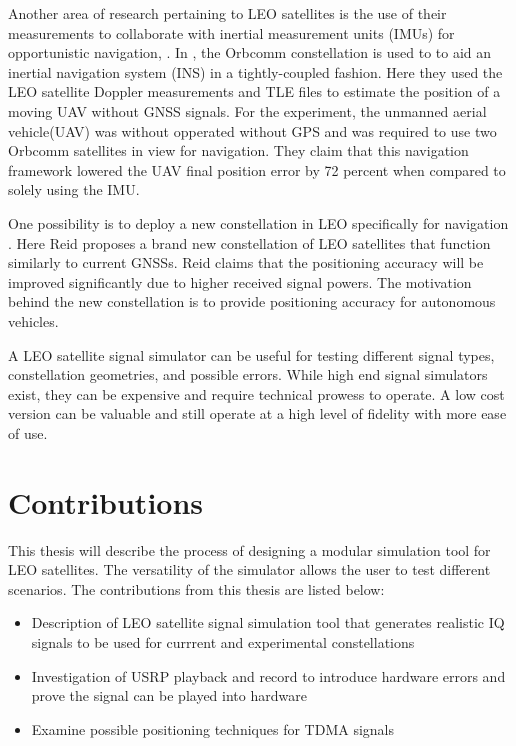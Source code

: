\documentclass[12pt]{report}
\begin{document}
Another area of research pertaining to LEO satellites is the use of their measurements to collaborate with inertial measurement units (IMUs) for opportunistic navigation\cite{khalifeReceiverDesignDoppler2019}, \cite{tanNewMethodPositioning2019}. In \cite{moralesInertialNavigationSystem2018}, the Orbcomm constellation is used to to aid an inertial navigation system (INS) in a tightly-coupled fashion. Here they used the LEO satellite Doppler measurements and TLE files to estimate the position of a moving UAV without GNSS signals. For the experiment, the unmanned aerial vehicle(UAV) was without opperated without GPS and was required to use two Orbcomm satellites in view for navigation. They claim that this navigation framework lowered the UAV final position error by 72 percent when compared to solely using the IMU.

One possibility is to deploy a new constellation in LEO specifically for navigation  \cite{reidSatelliteNavigationAge2020}. Here Reid proposes a brand new constellation of LEO satellites that function similarly to current GNSSs. Reid claims that the positioning accuracy will be improved significantly due to higher received signal powers. The motivation behind the new constellation is to provide positioning accuracy for autonomous vehicles.

A LEO satellite signal simulator can be useful for testing different signal types, constellation geometries, and possible errors. While high end signal simulators exist, they can be expensive and require technical prowess to operate. A low cost version can be valuable and still operate at a high level of fidelity with more ease of use. 

\section { Contributions}
This thesis will describe the process of designing a modular simulation tool for LEO satellites. The versatility of the simulator allows the user to test different scenarios. 
The contributions from this thesis are listed below:
\begin{itemize}
    \item Description of LEO satellite signal simulation tool that generates realistic IQ signals to be used for currrent and experimental constellations
    \item Investigation of USRP playback and record to introduce hardware errors and prove the signal can be played into hardware
    \item Examine possible positioning techniques for TDMA signals
    
\end{itemize}
\end{document}
